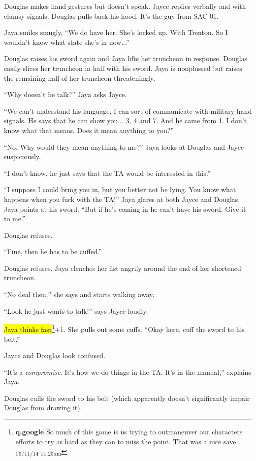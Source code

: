 Douglas makes hand gestures but doesn't speak.  Jayce replies verbally and with clumsy signals.  Douglas pulls back his hood.  It's the guy from SAC-01.

Jaya smiles smugly, ``We do have her.  She's locked up.  With Trenton.  So I wouldn't know what state she's in now...''

Douglas raises his sword again and Jaya lifts her truncheon in response.  Douglas easily slices her truncheon in half with his sword.  Jaya is nonplussed but raises the remaining half of her truncheon threateningly.

``Why doesn't he talk?'' Jaya asks Jayce.

``We can't understand his language, I can sort of communicate with military hand signals.  He says that he can show you... 3, 4 and 7.  And he came from 1.  I don't know what that means.  Does it mean anything to you?''

``No.  Why would they mean anything to me?''  Jaya looks at Douglas and Jayce suspiciously. 

``I don't know, he just says that the TA would be interested in this.''

``I suppose I could bring you in, but you better not be lying.  You know what happens when you fuck with the TA!''  Jaya glares at both Jayce and Douglas.  Jaya points at his sword.  ``But if he's coming in he can't have his sword. Give it to me.''

Douglas refuses.

``Fine, then he has to be cuffed.''

Douglas refuses.  Jaya clenches her fist angrily around the end of her shortened truncheon.

``No deal then,'' she says and starts walking away.

``Look he just wants to talk!'' says Jayce loudly.

\hl{Jaya thinks fast}\footnote{\textbf{q.google }So much of this game is us trying to outmaneuver our characters efforts to try as hard as they can to miss the point. That was a nice save . \textsubscript{05/11/14 11:25am}}+1.  She pulls out some cuffs.  ``Okay here, cuff the sword to his belt.''

Jayce and Douglas look confused.

``It's a \textit{compromise}.  It's how we do things in the TA.  It's in the manual,'' explains Jaya.

Douglas cuffs the sword to his belt (which apparently doesn't significantly impair Douglas from drawing it).

